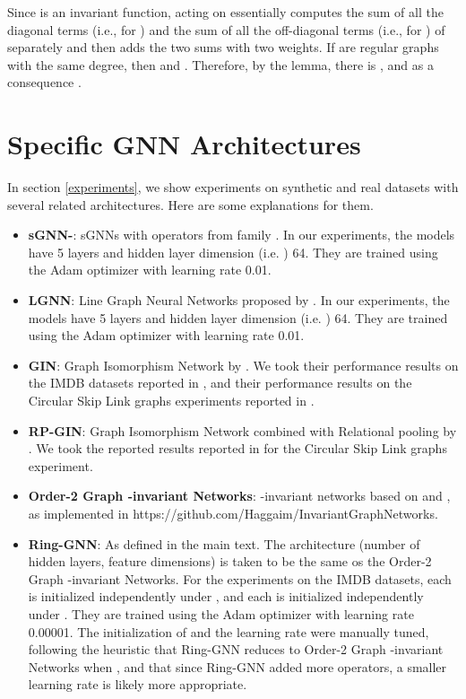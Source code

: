 \documentclass{article}
\begin{document}
Since  is an invariant function,  acting on  essentially computes the sum of all the diagonal terms (i.e., for ) and the sum of all the off-diagonal terms (i.e., for ) of  separately and then adds the two sums with two weights. If  are regular graphs with the same degree, then  and . Therefore, by the lemma, there is , and as a consequence .  
\newpage
\section{Specific GNN Architectures}
\label{archi}
In section \ref{experiments}, we show experiments on synthetic and real datasets with several related architectures. Here are some explanations for them.
\begin{itemize}
\item \textbf{sGNN-}: sGNNs with operators from family . In our experiments, the  models have 5 layers and hidden layer dimension (i.e. ) 64. They are trained using the Adam optimizer with learning rate 0.01.
\item \textbf{LGNN}: Line Graph Neural Networks proposed by \cite{chen2019cdsbm}. In our experiments, the  models have 5 layers and hidden layer dimension (i.e. ) 64. They are trained using the Adam optimizer with learning rate 0.01.
\item \textbf{GIN}: Graph Isomorphism Network by \cite{xu2018powerful}. We took their performance results on the IMDB datasets reported in \cite{xu2018powerful}, and their performance results on the Circular Skip Link graphs experiments reported in \cite{murphy2019relational} .
\item \textbf{RP-GIN}: Graph Isomorphism Network combined with Relational pooling by \cite{murphy2019relational}. We took the reported results reported in \cite{murphy2019relational} for the Circular Skip Link graphs experiment.
\item \textbf{Order-2 Graph -invariant Networks}: -invariant networks based on \cite{maron2018invariant} and \cite{maron2019universality}, as implemented in https://github.com/Haggaim/InvariantGraphNetworks.
\item \textbf{Ring-GNN}: As defined in the main text. The architecture (number of hidden layers, feature dimensions) is taken to be the same os the Order-2 Graph -invariant Networks. For the experiments on the IMDB datasets, each  is initialized independently under , and each  is initialized independently under . They are trained using the Adam optimizer with learning rate 0.00001. The initialization of  and the learning rate were manually tuned, following the heuristic that Ring-GNN reduces to Order-2 Graph -invariant Networks when ,  and that since Ring-GNN added more operators, a smaller learning rate is likely more appropriate.

\end{itemize}
\end{document}
